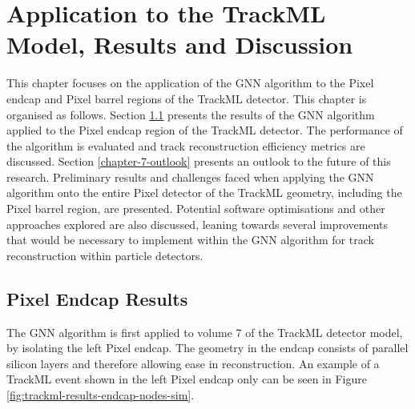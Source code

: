 
\chapter{Application to the TrackML Model, Results and Discussion}
\label{chapter-7}

This chapter focuses on the application of the GNN algorithm to the Pixel endcap and Pixel barrel regions of the TrackML detector. This chapter is organised as follows. Section \ref{chapter-7-endcap-results} presents the results of the GNN algorithm applied to the Pixel endcap region of the TrackML detector. The performance of the algorithm is evaluated and track reconstruction efficiency metrics are discussed. Section \ref{chapter-7-outlook} presents an outlook to the future of this research. Preliminary results and challenges faced when applying the GNN algorithm onto the entire Pixel detector of the TrackML geometry, including the Pixel barrel region, are presented. Potential software optimisations and other approaches explored are also discussed, leaning towards several improvements that would be necessary to implement within the GNN algorithm for track reconstruction within particle detectors.





\section{Pixel Endcap Results}
\label{chapter-7-endcap-results}

The GNN algorithm is first applied to volume 7 of the TrackML detector model, by isolating the left Pixel endcap. The geometry in the endcap consists of parallel silicon layers and therefore allowing ease in reconstruction. An example of a TrackML event shown in the left Pixel endcap only can be seen in Figure \ref{fig:trackml-results-endcap-nodes-sim}.

